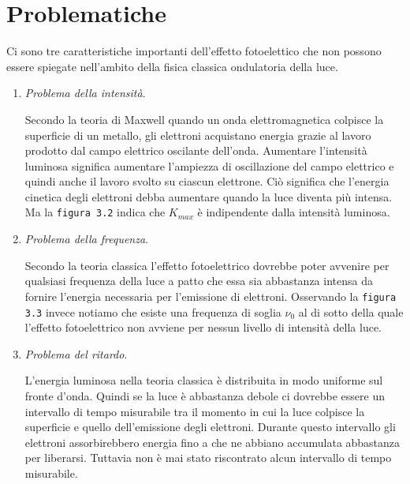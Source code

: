 \documentclass[12pt,twoside]{report}
\begin{document}
\section{Problematiche}
\par{Ci sono tre caratteristiche importanti dell'effetto fotoelettico che non possono essere spiegate nell'ambito della fisica classica ondulatoria della luce.}
\begin{enumerate}
\item \textit{Problema della intensità}.
\par{Secondo la teoria di Maxwell quando un onda elettromagnetica colpisce la superficie di un metallo, gli elettroni acquistano energia grazie al lavoro prodotto dal campo elettrico oscilante dell'onda. Aumentare l'intensità luminosa significa aumentare l'ampiezza di oscillazione del campo elettrico e quindi anche il lavoro svolto su ciascun elettrone. Ciò significa che l'energia cinetica degli elettroni debba aumentare quando la luce diventa più intensa. Ma la \texttt{figura 3.2} indica che $K_{max}$ è indipendente dalla intensità luminosa. }
\item \textit{Problema della frequenza}.
\par{Secondo la teoria classica l'effetto fotoelettrico dovrebbe poter avvenire per qualsiasi frequenza della luce a patto che essa sia abbastanza intensa da fornire l'energia necessaria per l'emissione di elettroni. Osservando la \texttt{figura 3.3} invece notiamo che esiste una frequenza di soglia $\nu_0$ al di sotto della quale l'effetto fotoelettrico non avviene per nessun livello di intensità della luce. }
\item \textit{Problema del ritardo}.
\par{L'energia luminosa nella teoria classica è distribuita in modo uniforme sul fronte d'onda. Quindi se la luce è abbastanza debole ci dovrebbe essere un intervallo di tempo misurabile tra il momento in cui la luce colpisce la superficie e quello dell'emissione degli elettroni. Durante questo intervallo gli elettroni assorbirebbero energia fino a che ne abbiano accumulata abbastanza per liberarsi. Tuttavia non è mai stato riscontrato alcun intervallo di tempo misurabile.}
\end{enumerate}
\end{document}
